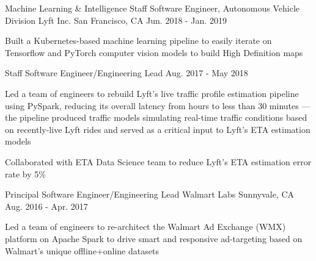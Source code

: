 \begin{cventries}
  \cventry
  {Machine Learning \& Intelligence Staff Software Engineer, Autonomous Vehicle Division} %
  {Lyft Inc.} %
  {San Francisco, CA} %
  {Jun. 2018 - Jan. 2019} %
  {
    \begin{cvitems} %
      \item{Built a Kubernetes-based machine learning pipeline to easily iterate on Tensorflow and PyTorch computer vision models to build High Definition maps}
    \end{cvitems}
  }

  \cventry
  {Staff Software Engineer/Engineering Lead} %
  {} %
  {} %
  {Aug. 2017 - May 2018} %
  {
    \begin{cvitems} %
      \item{Led a team of engineers to rebuild Lyft's live traffic profile estimation pipeline using PySpark, reducing its overall latency from hours to less than 30 minutes --- the pipeline produced traffic models simulating real-time traffic conditions based on recently-live Lyft rides and served as a critical input to Lyft's ETA estimation models}
      \item{Collaborated with ETA Data Science team to reduce Lyft's ETA estimation error rate by 5\%}
    \end{cvitems}
  }

  \cventry
  {Principal Software Engineer/Engineering Lead} %
  {Walmart Labs} %
  {Sunnyvale, CA} %
  {Aug. 2016 - Apr. 2017} %
  {
    \begin{cvitems} %
      \item{Led a team of engineers to re-architect the Walmart Ad Exchange (WMX) platform on Apache Spark to drive smart and responsive ad-targeting based on Walmart’s unique offline+online datasets}
    \end{cvitems}
  }


\end{cventries}
